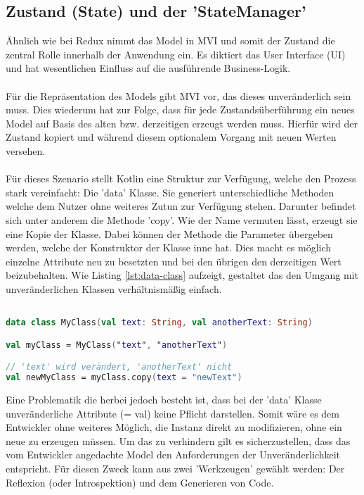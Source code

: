 \subsection{Zustand (State) und der 'StateManager'}
Ähnlich wie bei Redux nimmt das Model in MVI und somit der Zustand die zentral Rolle innerhalb der Anwendung ein. Es diktiert das User Interface (UI) und hat wesentlichen Einfluss auf die ausführende Business-Logik.
\\
\\
Für die Repräsentation des Models gibt MVI vor, das dieses unveränderlich sein muss. Dies wiederum hat zur Folge, dass für jede Zustandsüberführung ein neues Model auf Basis des alten bzw. derzeitigen erzeugt werden muss. Hierfür wird der Zustand kopiert und während diesem optionalem Vorgang mit neuen Werten versehen. 
\\
\\
Für dieses Szenario stellt Kotlin eine Struktur zur Verfügung, welche den Prozess stark vereinfacht: Die 'data' Klasse. Sie generiert unterschiedliche Methoden welche dem Nutzer ohne weiteres Zutun zur Verfügung stehen. Darunter befindet sich unter anderem die Methode 'copy'. Wie der Name vermuten lässt, erzeugt sie eine Kopie der Klasse. Dabei können der Methode die Parameter übergeben werden, welche der Konstruktor der Klasse inne hat. Dies macht es möglich einzelne Attribute neu zu besetzten und bei den übrigen den derzeitigen Wert beizubehalten. Wie Listing
\ref{lst:data-class}
aufzeigt, gestaltet das den Umgang mit unveränderlichen Klassen verhältnismäßig einfach.
\begin{lstlisting}[caption={data class}, label={lst:data-class}, language=Kotlin]

data class MyClass(val text: String, val anotherText: String)

val myClass = MyClass("text", "anotherText")

// 'text' wird verändert, 'anotherText' nicht
val newMyClass = myClass.copy(text = "newText")
\end{lstlisting}
\bigskip
Eine Problematik die herbei jedoch besteht ist, dass bei der 'data' Klasse unveränderliche Attribute (= val) keine Pflicht darstellen. Somit wäre es dem Entwickler ohne weiteres Möglich, die Instanz direkt zu modifizieren, ohne ein neue zu erzeugen müssen. Um das zu verhindern gilt es sicherzustellen, dass das vom Entwickler angedachte Model den Anforderungen der Unveränderlichkeit entspricht. Für diesen Zweck kann aus zwei 'Werkzeugen' gewählt werden: Der Reflexion (oder Introspektion) und dem Generieren von Code.  
